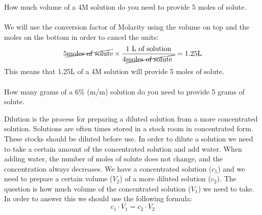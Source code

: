 \documentclass[main.tex]{subfiles} %
\begin{document}
\begin{description}
\begin{example} %
How much volume of a 4M solution do you need to provide 5 moles of solute.
\\
\\
We will use the conversion factor of Molarity using the volume on top and the moles on the bottom in order to cancel the units:
\begin{equation*}
5   \cancel{\text{moles of solute}} \times 
\dfrac{\text{1 L of solution}  } {  4\cancel{\text{moles of solute }}} =1.25\text{L}
\end{equation*}
This means that 1.25L of a 4M solution will provide 5 moles of solute.
\\
\faDiamond\ \\
How many grams of a 6\% (m/m) solution do you need to provide 5 grams of solute.
\\
\end{example}%



   
   
\item[\docfilehook{Dilution}{}] Dilution is the process for preparing a diluted solution from a more concentrated solution. Solutions are often times stored in a stock room in concentrated form. These stocks should be diluted before use. In order to dilute a solution we need to take a certain amount of the concentrated solution and add water. When adding water, the number of moles of solute does not change, and the concentration always decreases. We have a concentrated solution ($c_1$) and we need to prepare a certain volume ($V_2$) of a more diluted solution ($c_2$). The question is how much volume of the concentrated solution ($V_1$) we need to take. In order to answer this we should use the following formula:
 \begin{equation*}
\boxed{ c_1\cdot V_1=c_2\cdot V_2 }   
\end{equation*}


\end{description}
\end{document}
